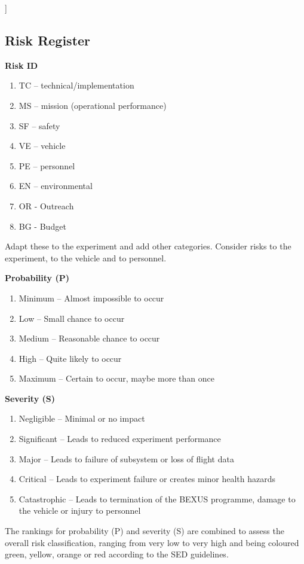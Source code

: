 ]\documentclass[a4paper,12pt,twoside]{article}
\begin{document}
\subsection{Risk Register}
\textbf{Risk ID}
\begin{enumerate}[label={}]
    \item TC – technical/implementation 
    \item MS – mission (operational performance) 
    \item SF – safety 
    \item VE – vehicle 
    \item PE – personnel 
    \item EN – environmental 
    \item OR - Outreach
    \item BG - Budget
\end{enumerate}

Adapt these to the experiment and add other categories. 
Consider risks to the experiment, to the vehicle and to personnel. 

\textbf{Probability (P)}
\begin{enumerate}[label=\Alph*]
    \item Minimum – Almost impossible to occur 
    \item Low – Small chance to occur 
    \item Medium – Reasonable chance to occur 
    \item High – Quite likely to occur 
    \item Maximum – Certain to occur, maybe more than once
\end{enumerate}

\textbf{Severity (S)}
\begin{enumerate}
    \item Negligible – Minimal or no impact 
    \item Significant – Leads to reduced experiment performance 
    \item Major – Leads to failure of subsystem or loss of flight data 
    \item Critical – Leads to experiment failure or creates minor health hazards 
    \item Catastrophic – Leads to termination of the BEXUS programme, damage to the vehicle or injury to personnel 
\end{enumerate}

The rankings for probability (P) and severity (S) are combined to assess the overall risk classification, ranging from very low to very high and being coloured green, yellow, orange or red according to the SED guidelines.
\end{document}
